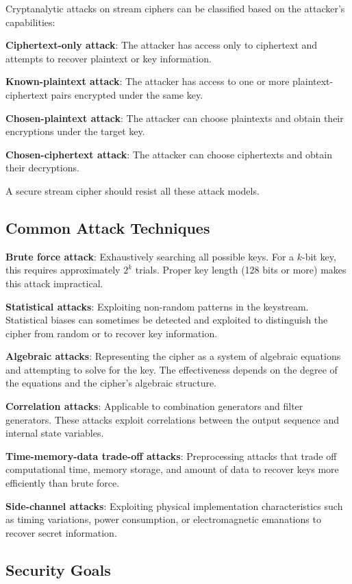 \documentclass[12pt,a4paper,oneside]{report}
\begin{document}
Cryptanalytic attacks on stream ciphers can be classified based on the attacker's capabilities:

\textbf{Ciphertext-only attack}: The attacker has access only to ciphertext and attempts to recover plaintext or key information.

\textbf{Known-plaintext attack}: The attacker has access to one or more plaintext-ciphertext pairs encrypted under the same key.

\textbf{Chosen-plaintext attack}: The attacker can choose plaintexts and obtain their encryptions under the target key.

\textbf{Chosen-ciphertext attack}: The attacker can choose ciphertexts and obtain their decryptions.

A secure stream cipher should resist all these attack models.

\subsection{Common Attack Techniques}

\textbf{Brute force attack}: Exhaustively searching all possible keys. For a $k$-bit key, this requires approximately $2^k$ trials. Proper key length (128 bits or more) makes this attack impractical.

\textbf{Statistical attacks}: Exploiting non-random patterns in the keystream. Statistical biases can sometimes be detected and exploited to distinguish the cipher from random or to recover key information.

\textbf{Algebraic attacks}: Representing the cipher as a system of algebraic equations and attempting to solve for the key. The effectiveness depends on the degree of the equations and the cipher's algebraic structure.

\textbf{Correlation attacks}: Applicable to combination generators and filter generators. These attacks exploit correlations between the output sequence and internal state variables.

\textbf{Time-memory-data trade-off attacks}: Preprocessing attacks that trade off computational time, memory storage, and amount of data to recover keys more efficiently than brute force.

\textbf{Side-channel attacks}: Exploiting physical implementation characteristics such as timing variations, power consumption, or electromagnetic emanations to recover secret information.

\subsection{Security Goals}
\end{document}
